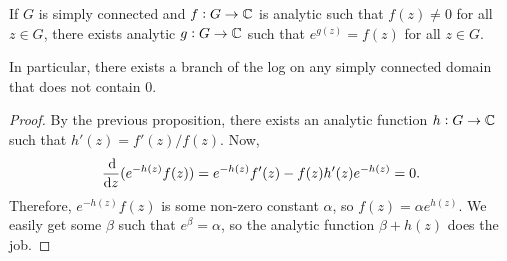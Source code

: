 		\begin{corollary}
			If $G$ is simply connected and $f : G \to \mathbb{C}$ is analytic such that $f(z) \ne 0$ for all $z \in G$, there exists analytic $g : G \to \mathbb{C}$ such that $e^{g(z)} = f(z)$ for all $z \in G$.
		\end{corollary}

		In particular, there exists a branch of the log on any simply connected domain that does not contain $0$.

		\begin{proof}
			By the previous proposition, there exists an analytic function $h : G \to \mathbb{C}$ such that $h'(z) = f'(z) / f(z)$. Now,
			\[ \frac{\dif}{\dif z} (e^{-h(z)} f(z)) = e^{-h(z)} f'(z) - f(z) h'(z) e^{-h(z)} = 0. \]
			Therefore, $e^{-h(z)} f(z)$ is some non-zero constant $\alpha$, so $f(z) = \alpha e^{h(z)}$. We easily get some $\beta$ such that $e^{\beta} = \alpha$, so the analytic function $\beta + h(z)$ does the job.
		\end{proof}